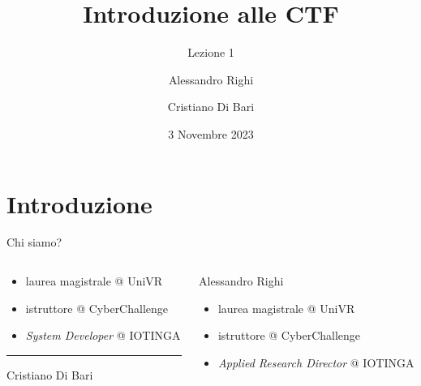 \documentclass[12pt]{beamer}
\title{Introduzione alle CTF}
\subtitle{Lezione 1}
\author{Alessandro Righi \and Cristiano Di Bari}
\institute{Università degli Studi di Verona}
\date{3 Novembre 2023}
\begin{document}
\begin{frame}
\titlepage
\end{frame}

\section{Introduzione}

\begin{frame}{Chi siamo?}
\begin{columns}[T] %
\begin{column}{.48\textwidth}
\begin{itemize}
\item laurea magistrale @ UniVR
\item istruttore @ CyberChallenge
\item \textit{System Developer} @ IOTINGA
\end{itemize}        
{\color{blue}\rule{\linewidth}{2pt}}%
\begin{center}
Cristiano Di Bari
\end{center}
\end{column}%
\hfill%
\begin{column}{.48\textwidth}%
\begin{center}%

Alessandro Righi
\color{blue}{\rule{\linewidth}{2pt}}%
\begin{itemize}
\item laurea magistrale @ UniVR
\item istruttore @ CyberChallenge
\item \textit{Applied Research Director} @ IOTINGA
\end{itemize}
\end{center}
\end{column}%
\end{columns}
\end{frame}
\end{document}
